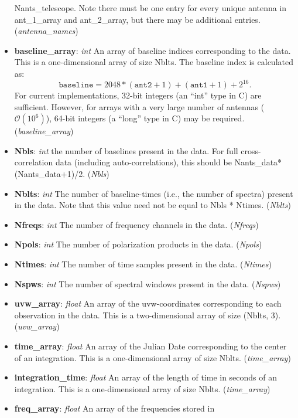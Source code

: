 \documentclass[11pt, oneside]{article}
\begin{document}
\begin{itemize}
  Nants\_telescope. Note there must be one entry for every unique antenna in
  ant\_1\_array and ant\_2\_array, but there may be additional
  entries. (\textit{antenna\_names})
\item \textbf{baseline\_array}: \textit{int} An array of baseline indices
  corresponding to the data. This is a one-dimensional array of size Nblts. The
  baseline index is calculated as:
  \[
    \mathtt{baseline} = 2048*(\mathtt{ant2}+1)+(\mathtt{ant1}+1) + 2^{16}.
  \]
  For current implementations, 32-bit integers (an ``int'' type in C) are
  sufficient. However, for arrays with a very large number of antennas
  ($\mathcal{O}(10^6)$), 64-bit integers (a ``long'' type in C) may be
  required. (\textit{baseline\_array})
\item \textbf{Nbls}: \textit{int} the number of baselines present in the
  data. For full cross-correlation data (including auto-correlations), this
  should be Nants\_data*(Nants\_data+1)/2. (\textit{Nbls})
\item \textbf{Nblts}: \textit{int} The number of baseline-times (i.e., the
  number of spectra) present in the data. Note that this value need not be equal
  to Nbls * Ntimes. (\textit{Nblts})
\item \textbf{Nfreqs}: \textit{int} The number of frequency channels in the
  data. (\textit{Nfreqs})
\item \textbf{Npols}: \textit{int} The number of polarization products in the
  data. (\textit{Npols})
\item \textbf{Ntimes}: \textit{int} The number of time samples present in the
  data. (\textit{Ntimes})
\item \textbf{Nspws}: \textit{int} The number of spectral windows present in the
  data. (\textit{Nspws})
\item \textbf{uvw\_array}: \textit{float} An array of the uvw-coordinates
  corresponding to each observation in the data. This is a two-dimensional array of
  size (Nblts, 3). (\textit{uvw\_array})
\item \textbf{time\_array}: \textit{float} An array of the Julian Date
  corresponding to the center of an integration. This is a one-dimensional array
  of size Nblts. (\textit{time\_array})
\item \textbf{integration\_time}: \textit{float} An array of the length of time
  in seconds of an integration. This is a one-dimensional array of size
  Nblts. (\textit{time\_array})
\item \textbf{freq\_array}: \textit{float} An array of the frequencies stored in

\end{itemize}
\end{document}
